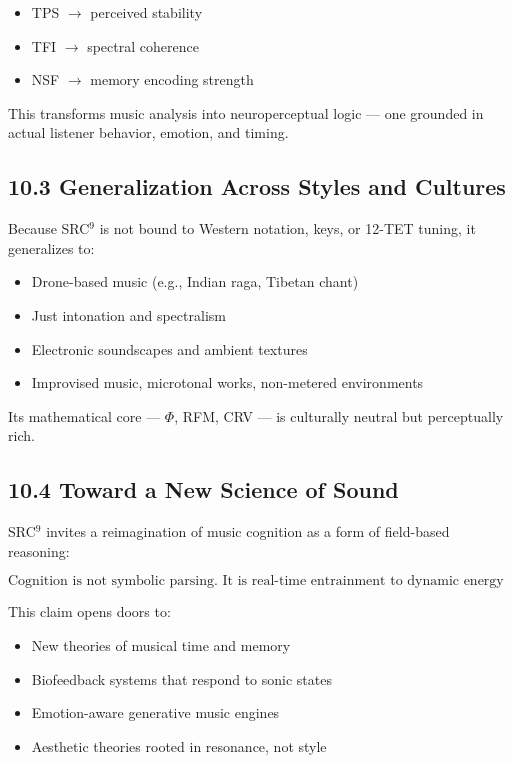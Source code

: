 \begin{itemize}
    \item TPS $\rightarrow$ perceived stability
    \item TFI $\rightarrow$ spectral coherence
    \item NSF $\rightarrow$ memory encoding strength
\end{itemize}

This transforms music analysis into neuroperceptual logic — one grounded in actual listener behavior, emotion, and timing.

\subsection*{10.3 Generalization Across Styles and Cultures}

Because SRC$^{9}$ is not bound to Western notation, keys, or 12-TET tuning, it generalizes to:

\begin{itemize}
    \item Drone-based music (e.g., Indian raga, Tibetan chant)
    \item Just intonation and spectralism
    \item Electronic soundscapes and ambient textures
    \item Improvised music, microtonal works, non-metered environments
\end{itemize}

Its mathematical core — $\Phi$, RFM, CRV — is culturally neutral but perceptually rich.

\subsection*{10.4 Toward a New Science of Sound}

SRC$^{9}$ invites a reimagination of music cognition as a form of field-based reasoning:

\[
\text{Cognition is not symbolic parsing. It is real-time entrainment to dynamic energy structures.}
\]

This claim opens doors to:

\begin{itemize}
    \item New theories of musical time and memory
    \item Biofeedback systems that respond to sonic states
    \item Emotion-aware generative music engines
    \item Aesthetic theories rooted in resonance, not style
\end{itemize}

